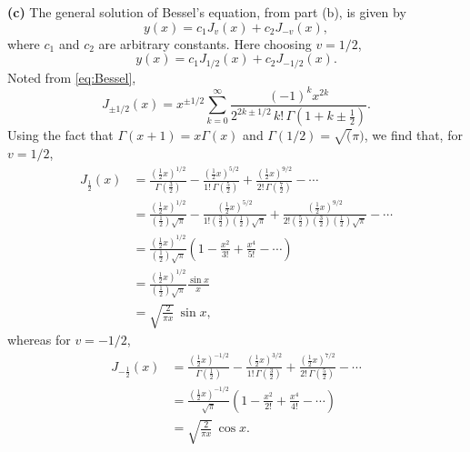 \documentclass[12pt]{article}
\begin{document}
\pagebreak
\noindent\textbf{(c)} \quad The general solution of Bessel's equation, from part (b), is given by
\begin{equation}
    y(x) = c_1 J_v(x) + c_2 J_{-v}(x),
\end{equation}
where $c_1$ and $c_2$ are arbitrary constants. Here choosing $v = 1/2$, 
\begin{equation}
    y(x) = c_1 J_{1/2}(x) + c_2 J_{-1/2}(x).
\end{equation}
Noted from \eqref{eq:Bessel}, 
\begin{equation}
    J_{\pm 1/2}(x) = x^{\pm 1/2} \sum_{k=0}^{\infty} \frac{(-1)^k x^{2k}}{2^{2k \pm 1/2}\,k!\, \Gamma(1 + k \pm \frac{1}{2})}.
\end{equation}
Using the fact that $\Gamma(x + 1) = x \Gamma(x)$ and $ \Gamma(1/2) = \sqrt(\pi)$, we find that, for $v = 1/2$,
\begin{equation}
\begin{aligned}
J_{\frac{1}{2}}(x)
&= \frac{\left(\frac{1}{2}x\right)^{1/2}}{\Gamma\left(\frac{3}{2}\right)}
 - \frac{\left(\frac{1}{2}x\right)^{5/2}}{1!\,\Gamma\left(\frac{5}{2}\right)}
 + \frac{\left(\frac{1}{2}x\right)^{9/2}}{2!\,\Gamma\left(\frac{7}{2}\right)}
 - \cdots\\
&= \frac{\left(\frac{1}{2}x\right)^{1/2}}
         {\left(\frac{1}{2}\right)\sqrt{\pi}}
 - \frac{\left(\frac{1}{2}x\right)^{5/2}}
         {1!\left(\frac{3}{2}\right)\left(\frac{1}{2}\right)\sqrt{\pi}}
 + \frac{\left(\frac{1}{2}x\right)^{9/2}}
         {2!\left(\frac{5}{2}\right)\left(\frac{3}{2}\right)
         \left(\frac{1}{2}\right)\sqrt{\pi}}
 - \cdots\\
&= \frac{\left(\frac{1}{2}x\right)^{1/2}}
         {\left(\frac{1}{2}\right)\sqrt{\pi}}
   \left(1-\frac{x^2}{3!}+\frac{x^4}{5!}-\cdots\right)\\
&= \frac{\left(\frac{1}{2}x\right)^{1/2}}
         {\left(\frac{1}{2}\right)\sqrt{\pi}}
   \frac{\sin x}{x}\\
&= \sqrt{\frac{2}{\pi x}}\,\sin x,
\end{aligned}
\end{equation}
whereas for $v = -1/2$,
\begin{equation}
\begin{aligned}
J_{-\frac{1}{2}}(x)
&= \frac{\left(\frac{1}{2}x\right)^{-1/2}}{\Gamma\left(\frac{1}{2}\right)}
 - \frac{\left(\frac{1}{2}x\right)^{3/2}}{1!\,\Gamma\left(\frac{3}{2}\right)}
 + \frac{\left(\frac{1}{2}x\right)^{7/2}}{2!\,\Gamma\left(\frac{5}{2}\right)}
 - \cdots\\
&= \frac{\left(\frac{1}{2}x\right)^{-1/2}}{\sqrt{\pi}}
   \left(1-\frac{x^2}{2!}+\frac{x^4}{4!}-\cdots\right)\\
&= \sqrt{\frac{2}{\pi x}}\,\cos x.
\end{aligned}
\end{equation}
\end{document}
